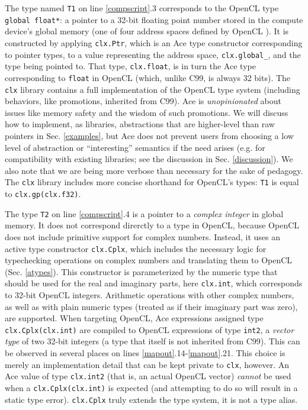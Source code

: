 \documentclass[9pt,preprint]{sigplanconf}
\begin{document}
The type named \verb|T1| on line \ref{compscript}.3 corresponds to the OpenCL type \verb|global float*|: a pointer to a 32-bit floating point number stored in the compute device's global memory (one of four address spaces defined by OpenCL \cite{opencl11}). It is constructed by applying \verb|clx.Ptr|, which is an Ace type constructor corresponding to pointer types, to a value representing the  address space, \verb|clx.global_|, and the type being pointed to. That type, \verb|clx.float|, is in turn the Ace type corresponding to \verb|float| in OpenCL (which, unlike C99, is always 32 bits). 
The \verb|clx| library contains a full implementation of the OpenCL type system (including behaviors, like promotions, inherited from C99).
Ace is \emph{unopinionated} about issues like memory safety and the wisdom of such promotions. We will discuss how to implement, as libraries, abstractions that are higher-level than raw pointers in Sec. \ref{examples}, but Ace does not prevent users from choosing a low level of abstraction or ``interesting'' semantics if the need arises (e.g. for compatibility with existing libraries; see the discussion in Sec. \ref{discussion}). We also note that we are being more verbose than necessary for the sake of pedagogy. The \verb|clx| library includes more concise shorthand for OpenCL's types: \verb|T1| is equal to \verb|clx.gp(clx.f32)|. %

The type \verb|T2| on line \ref{compscript}.4 is a pointer to a \emph{complex integer} in global memory. It does not correspond direrctly to a type in OpenCL, because OpenCL does not include primitive support for complex numbers. Instead, it uses an active type constructor \verb|clx.Cplx|, which includes the necessary logic for typechecking operations on complex numbers and translating them to OpenCL (Sec. \ref{atypes}). This constructor is parameterized by the numeric type that should be used for the real and imaginary parts, here \verb|clx.int|, which corresponds to 32-bit OpenCL integers. Arithmetic operations with other complex numbers, as well as with plain numeric types (treated as if their imaginary part was zero), are supported. When targeting OpenCL, Ace expressions assigned type \verb|clx.Cplx(clx.int)| are compiled to OpenCL expressions of type \verb|int2|, a  \emph{vector type} of two 32-bit integers (a type that itself is not inherited from C99). This can be observed in several places on lines \ref{mapout}.14-\ref{mapout}.21. This choice is merely an implementation detail that can be kept private to \verb|clx|, however. An Ace value of type \verb|clx.int2| (that is, an actual OpenCL vector) \emph{cannot} be used when a \verb|clx.Cplx(clx.int)| is expected (and attempting to do so will result in a static type error). \verb|clx.Cplx| truly extends the type system, it is not a type alias.
\end{document}
